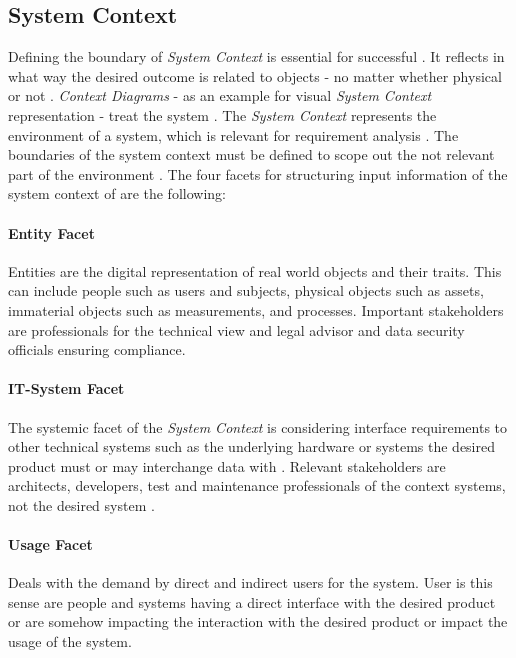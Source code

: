 \subsection{System Context}
Defining the boundary of \textit{System Context} is essential for successful . It reflects in what way the desired outcome is related to objects - no matter whether physical or not \parencite[55]{Pohl.2007}. \textit{Context Diagrams} - as an example for visual \textit{System Context} representation - treat the system  \parencite[76]{Lauesen.2008}. The \textit{System Context} represents the environment of a system, which is relevant for requirement analysis \parencite[55]{Pohl.2007}. The boundaries of the system context must be defined to scope out the not relevant part of the environment \parencite[55-56]{Pohl.2007}. The four facets for structuring input information of the system context of \textcite{Pohl.2007} are the following:
\paragraph*{Entity Facet} 
Entities are the digital representation of real world objects and their traits. This can include people such as users and subjects, physical objects such as assets, immaterial objects such as measurements, and processes. Important stakeholders are  professionals for the technical view and legal advisor and data security officials ensuring compliance. \parencite[cf.][70-71]{Pohl.2007}
\paragraph*{IT-System Facet}
The systemic facet of the \textit{System Context} is considering interface requirements to other technical systems such as the underlying hardware or systems the desired product must or may interchange data with \parencite[cf.][192]{Kotonya.2000}. Relevant stakeholders are architects, developers, test and maintenance professionals of the context systems, not the desired system \parencite[cf.][72]{Pohl.2007}.
\paragraph*{Usage Facet} Deals with the demand by direct and indirect users for the system. User is this sense are people and systems having a direct interface with the desired product or are somehow impacting the interaction with the desired product or impact the usage of the system. \parencite[cf.][75-77]{Pohl.2007}
